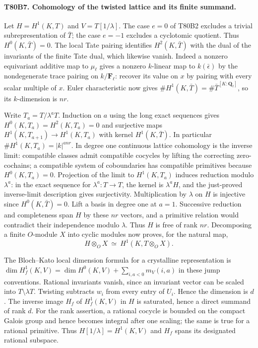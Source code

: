 \paragraph{T80B7. Cohomology of the twisted lattice and its finite summand.}
Let $H=H^1(K,T)$ and $V=T[1/\lambda]$. The case $e=0$ of
T80B2 excludes a trivial subrepresentation of $\bar T$; the case
$e=-1$ excludes a cyclotomic quotient. Thus $H^0(K,\bar T)=0$.
The local Tate pairing identifies $H^2(K,\bar T)$ with the dual of
the invariants of the finite Tate dual, which likewise vanish.
Indeed a nonzero equivariant additive map to $\mu_\ell$ gives a
nonzero $k$-linear map to $k(\bar\epsilon)$ by the nondegenerate
trace pairing on $k/\mathbf F_\ell$: recover its value on $x$ by
pairing with every scalar multiple of $x$. Euler characteristic now gives
$\#H^1(K,\bar T)=\#\bar T^{[K:\mathbf Q_\ell]}$, so its
$k$-dimension is $nr$.

Write $T_a=T/\lambda^aT$. Induction on $a$ using the long exact
sequences gives $H^0(K,T_a)=H^2(K,T_a)=0$ and surjective maps
$H^1(K,T_{a+1})\to H^1(K,T_a)$ with kernel $H^1(K,\bar T)$.
In particular $\#H^1(K,T_a)=|k|^{anr}$. In degree one continuous
lattice cohomology is the inverse limit: compatible classes admit
compatible cocycles by lifting the correcting zero-cochains; a compatible
system of coboundaries has compatible primitives because $H^0(K,T_a)=0$.
Projection of the limit to $H^1(K,T_a)$ induces reduction modulo
$\lambda^a$: in the exact sequence for $\lambda^a:T\to T$, the
kernel is $\lambda^a H$, and the just-proved inverse-limit description
gives surjectivity. Multiplication by $\lambda$ on $H$ is injective
since $H^0(K,\bar T)=0$. Lift a basis in degree one at $a=1$.
Successive reduction and completeness span $H$ by these $nr$ vectors,
and a primitive relation would contradict their independence modulo
$\lambda$. Thus $H$ is free of rank $nr$.
Decomposing a finite $O$-module $X$ into cyclic modules now proves,
for the natural map,
\[
 H\otimes_O X\ \simeq\ H^1(K,T\otimes_O X).
\]

The Bloch--Kato local dimension formula for a crystalline representation
is $\dim H^1_f(K,V)=\dim H^0(K,V)+\sum_{i,a<0}m_V(i,a)$ in these
jump conventions. Rational invariants vanish, since an invariant vector
can be scaled into $T\setminus\lambda T$. Twisting subtracts $w_i$
from every entry of $U_i$. Hence the dimension is $d$.
The inverse image $H_f$ of $H^1_f(K,V)$ in $H$ is saturated, hence a
direct summand of rank $d$. For the rank assertion, a rational cocycle
is bounded on the compact Galois group and hence becomes integral after
one scaling; the same is true for a rational primitive. Thus
$H[1/\lambda]=H^1(K,V)$ and $H_f$ spans its designated rational
subspace.

